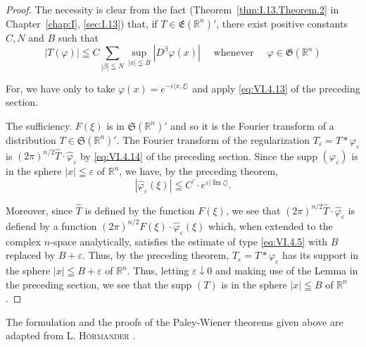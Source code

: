 \begin{proof}
 The necessity is clear from the fact (Theorem~\ref{thm:I.13.Theorem.2} in Chapter~\ref{chap:I}, \ref{sec:I.13}) that, if $T \in \mathfrak{E}(\mathbb{R}^{n})'$, there exist positive constants $C, N$ and $B$ such that 
\[
\left| T (\varphi) \right| \leqq C \sum\limits_{| \beta | \leqq N} \sup\limits _{| x | \leqq B} \left| D ^{\beta} \varphi (x) \right| \quad \text{ whenever } \quad \varphi \in \mathfrak {G} (\mathbb{R}^{n}) \]

For, we have only to take $\varphi(x) = e^{-i\langle x,\xi\rangle}$ and apply \eqref{eq:VI.4.13} of the preceding section. 

The sufficiency. $F(\xi)$ is in $\mathfrak{S}(\mathbb{R}^{n})'$ and so it is the Fourier transform of a distribution $T \in \mathfrak{S}(\mathbb{R}^{n})'$. The Fourier transform of the regularization $T_{\varepsilon} = T * \varphi_{\varepsilon}$ is $(2\pi)^{n/2} \hat{T} \cdot \hat{\varphi}_{\varepsilon}$ by \eqref{eq:VI.4.14} of the preceding section. Since the supp $(\varphi_{\varepsilon})$ is in the sphere $|x| \leqq \varepsilon$ of $\mathbb{R}^{n}$, we have, by the preceding theorem, 
\[
\left| \hat {\varphi} _{\varepsilon} (\xi) \right| \leqq C ^{\prime} \cdot e ^{\varepsilon | \operatorname{Im} \zeta |}.
\]

Moreover, since $\hat{T}$ is defined by the function $F(\xi)$, we see that $(2\pi)^{n/2} \hat{T} \cdot \hat{\varphi}_{\varepsilon}$ is defiend by a function $(2\pi)^{n/2} F(\xi) \cdot \hat{\varphi}_{\varepsilon}(\xi)$ which, when extended to the complex $n$-space analytically, satisfies the estimate of type \eqref{eq:VI.4.5} with $B$ replaced by $B + \varepsilon$. Thus, by the preceding theorem, $T_{\varepsilon} = T * \varphi_{\varepsilon}$ has its support in the sphere $|x| \leqq B + \varepsilon$ of $\mathbb{R}^{n}$. Thus, letting $\varepsilon \downarrow 0$ and making use of the Lemma in the preceding section, we see that the supp $(T)$ is in the sphere $|x| \leqq B$ of $\mathbb{R}^{n}$. 
\end{proof}
\begin{remarku} The formulation and the proofs of the Paley-Wiener theorems given above are adapted from L. \textsc{Hörmander} \cite{hormander114}. 
\end{remarku}

